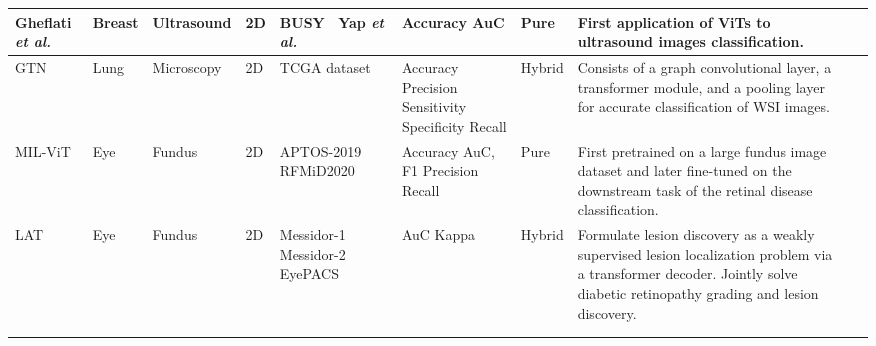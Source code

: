 \begin{table}[]
{\begin{tabular}{V{3}l|l|p{2cm}|l|p{2.5cm}|p{2cm}|l|p{7cm}V{3}}
Gheflati \textit{et al.}\cite{gheflati2021vision} & Breast         & Ultrasound        & 2D                        &  BUSY~\cite{al2020dataset} \newline Yap \textit{et al.}~\cite{yap2017automated}                             & Accuracy \newline AuC                                                 & Pure           & First application of ViTs to ultrasound images classification.    
\\ \hline
{\color{teal}GTN}~\cite{zheng2021deep} & Lung         & Microscopy        & 2D                        &  TCGA dataset~\cite{napel2014nsclc}                             & Accuracy \newline Precision \newline Sensitivity \newline Specificity \newline Recall                                                 & Hybrid          & Consists of a graph convolutional layer, a transformer module, and a pooling layer for accurate classification of WSI images.    
\\ \hline
MIL-ViT~\cite{yu2021mil} & Eye         & Fundus        & 2D                        &  APTOS-2019~\cite{aptos19} \newline  RFMiD2020~\cite{quellec2020automatic}                             & Accuracy \newline AuC, F1 \newline Precision \newline Recall                                                 & Pure           &  First pretrained on a large fundus image dataset and later fine-tuned
on the downstream task of the retinal disease classification.   \\ \hline
LAT~\cite{sun2021lesion} & Eye         & Fundus        & 2D                        &  Messidor-1 ~~\cite{decenciere2014feedback} \newline  Messidor-2~\cite{decenciere2014feedback} \newline EyePACS~\cite{cuadros2009eyepacs}                             & AuC \newline Kappa                                                & Hybrid           &  Formulate lesion discovery as a weakly supervised lesion localization problem via
a transformer decoder. Jointly solve diabetic retinopathy grading and lesion discovery. 
\\ 
    \\  


\end{tabular}}
\end{table}

